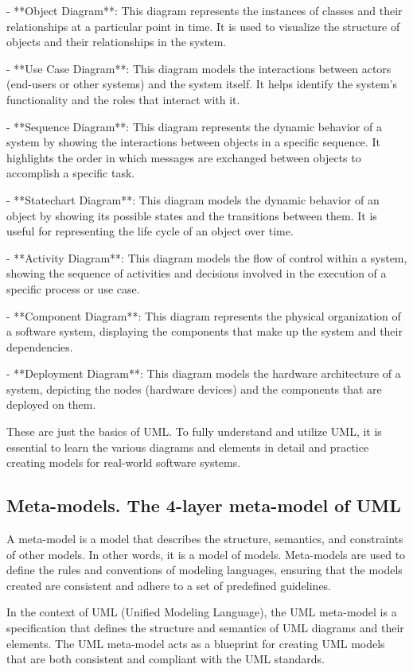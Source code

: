\documentclass{article}
\begin{document}
- **Object Diagram**: This diagram represents the instances of classes and their relationships at a particular point in time. It is used to visualize the structure of objects and their relationships in the system.

- **Use Case Diagram**: This diagram models the interactions between actors (end-users or other systems) and the system itself. It helps identify the system's functionality and the roles that interact with it.

- **Sequence Diagram**: This diagram represents the dynamic behavior of a system by showing the interactions between objects in a specific sequence. It highlights the order in which messages are exchanged between objects to accomplish a specific task.

- **Statechart Diagram**: This diagram models the dynamic behavior of an object by showing its possible states and the transitions between them. It is useful for representing the life cycle of an object over time.

- **Activity Diagram**: This diagram models the flow of control within a system, showing the sequence of activities and decisions involved in the execution of a specific process or use case.

- **Component Diagram**: This diagram represents the physical organization of a software system, displaying the components that make up the system and their dependencies.

- **Deployment Diagram**: This diagram models the hardware architecture of a system, depicting the nodes (hardware devices) and the components that are deployed on them.

These are just the basics of UML. To fully understand and utilize UML, it is essential to learn the various diagrams and elements in detail and practice creating models for real-world software systems.


\subsection{Meta-models. The 4-layer meta-model of UML}

A meta-model is a model that describes the structure, semantics, and constraints of other models. In other words, it is a model of models. Meta-models are used to define the rules and conventions of modeling languages, ensuring that the models created are consistent and adhere to a set of predefined guidelines.

In the context of UML (Unified Modeling Language), the UML meta-model is a specification that defines the structure and semantics of UML diagrams and their elements. The UML meta-model acts as a blueprint for creating UML models that are both consistent and compliant with the UML standards.
\end{document}
